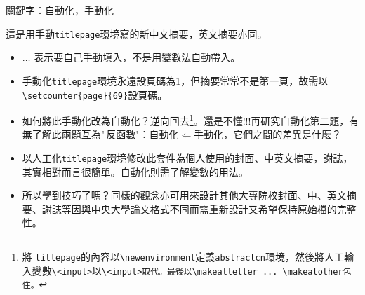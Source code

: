 \begin{appendB}
\begin{titlepage}
\vspace{1cm}

關鍵字：自動化，手動化
\vspace{2ex}

這是用手動{\tt titlepage}環境寫的新中文摘要，英文摘要亦同。

\begin{itemize}
\item $\ldots$ 表示要自己手動填入，不是用變數法自動帶入。
\item 手動化{\tt titlepage}環境永遠設頁碼為1，但摘要常常不是第一頁，故需以\verb|\setcounter{page}{69}|設頁碼。
\item 如何將此手動化改為自動化？逆向回去\footnote{將 {\tt titlepage}的內容以{\tt \textbackslash newenvironment}定義{\tt abstractcn}環境，然後將人工輸入變數{\tt \textbackslash<input>}以{\tt \textbackslash {}<input>取代。最後以{\tt \textbackslash makeatletter ... \textbackslash makeatother}包住。}}。還是不懂!!!再研究自動化第二題，有無了解此兩題互為"\,反函數"：自動化$\Leftarrow$手動化，它們之間的差異是什麼？
\item 以人工化{\tt titlepage}環境修改此套件為個人使用的封面、中英文摘要，謝誌，其實相對而言很簡單。自動化則需了解變數的用法。
\item 所以學到技巧了嗎？同樣的觀念亦可用來設計其他大專院校封面、中、英文摘要、謝誌等因與中央大學論文格式不同而需重新設計又希望保持原始檔的完整性。
\end{itemize}
\end{titlepage}

\clearpage{}
{} 
% 
\end{appendB}